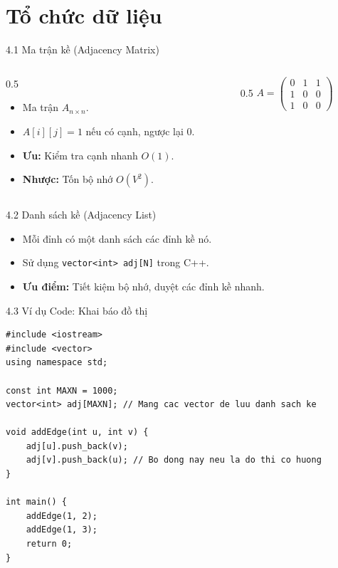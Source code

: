 \documentclass[aspectratio=169]{beamer}
\begin{document}
\section{Tổ chức dữ liệu}
\begin{frame}{4.1 Ma trận kề (Adjacency Matrix)}
    \begin{columns}
        \begin{column}{0.5\textwidth}
            \begin{itemize}
                \item Ma trận $A_{n \times n}$.
                \item $A[i][j] = 1$ nếu có cạnh, ngược lại $0$.
                \item \textbf{Ưu:} Kiểm tra cạnh nhanh $O(1)$.
                \item \textbf{Nhược:} Tốn bộ nhớ $O(V^2)$.
            \end{itemize}
        \end{column}
        \begin{column}{0.5\textwidth}
            $A = \begin{pmatrix} 0 & 1 & 1 \\ 1 & 0 & 0 \\ 1 & 0 & 0 \end{pmatrix}$
        \end{column}
    \end{columns}
\end{frame}

\begin{frame}{4.2 Danh sách kề (Adjacency List)}
    \begin{itemize}
        \item Mỗi đỉnh có một danh sách các đỉnh kề nó.
        \item Sử dụng \texttt{vector<int> adj[N]} trong C++.
        \item \textbf{Ưu điểm:} Tiết kiệm bộ nhớ, duyệt các đỉnh kề nhanh.
    \end{itemize}
    
\end{frame}

\begin{frame}[fragile]{4.3 Ví dụ Code: Khai báo đồ thị}
\begin{lstlisting}
#include <iostream>
#include <vector>
using namespace std;

const int MAXN = 1000;
vector<int> adj[MAXN]; // Mang cac vector de luu danh sach ke

void addEdge(int u, int v) {
    adj[u].push_back(v);
    adj[v].push_back(u); // Bo dong nay neu la do thi co huong
}

int main() {
    addEdge(1, 2);
    addEdge(1, 3);
    return 0;
}
\end{lstlisting}
\end{frame}
\end{document}
